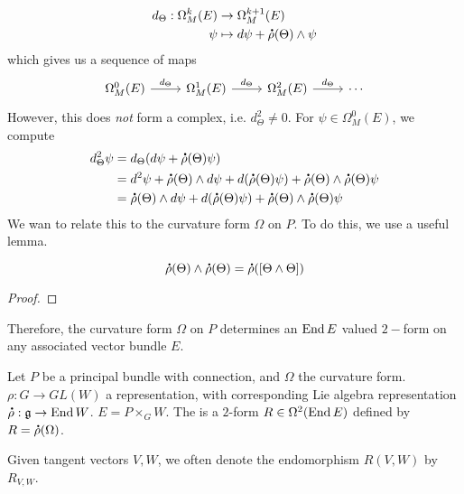 %
\begin{align*}
d_\Theta : \Omega^k_M(E) &\to \Omega^{k+1}_M(E) \\
\psi &\mapsto d\psi + \accentset{\mbox{\large\bfseries .}}{\rho}(\Theta) \wedge \psi
\end{align*}
%
which gives us a sequence of maps
\[\begin{tikzcd}
\Omega^0_M(E) \ar[r, "d_\Theta"] & \Omega^1_M(E) \ar[r, "d_\Theta"]
& \Omega^2_M(E) \ar[r, "d_\Theta"]  & \cdots
\end{tikzcd}\]
However, this does \emph{not} form a complex, i.e. $d_\Theta^2 \neq 0$. For
$\psi \in \Omega^0_M(E)$, we compute
%
\begin{align*}
d_\Theta^2\psi &= d_\Theta(d\psi + \accentset{\mbox{\large\bfseries .}}{\rho}(\Theta)\psi) \\
&= d^2\psi + \accentset{\mbox{\large\bfseries .}}{\rho}(\Theta) \wedge d\psi + d(\accentset{\mbox{\large\bfseries .}}{\rho}(\Theta)\psi)
+ \accentset{\mbox{\large\bfseries .}}{\rho}(\Theta) \wedge \accentset{\mbox{\large\bfseries .}}{\rho}(\Theta)\psi \\
&= \accentset{\mbox{\large\bfseries .}}{\rho}(\Theta) \wedge d\psi + d(\accentset{\mbox{\large\bfseries .}}{\rho}(\Theta)\psi)
+ \accentset{\mbox{\large\bfseries .}}{\rho}(\Theta) \wedge \accentset{\mbox{\large\bfseries .}}{\rho}(\Theta)\psi
\end{align*}
%
We wan to relate this to the curvature form $\Omega$ on $P$. To do this, we use a
useful lemma.
%
\begin{lem}
\[
\accentset{\mbox{\large\bfseries .}}{\rho}(\Theta) \wedge \accentset{\mbox{\large\bfseries .}}{\rho}(\Theta) = \accentset{\mbox{\large\bfseries .}}{\rho}([\Theta \wedge \Theta])
\]
\end{lem}
%
\begin{proof}

\end{proof}
%
Therefore, the curvature form $\Omega$ on $P$ determines an $\operatorname{End} E$ valued
$2-$form on any associated vector bundle $E$.
%
\begin{defn}
Let $P$ be a principal bundle with connection, and $\Omega$ the curvature form.
$\rho : G \to GL(W)$ a representation, with corresponding Lie algebra representation
$\accentset{\mbox{\large\bfseries .}}{\rho} : \mathfrak{g} \to \operatorname{End} W$. $E = P \times_G W$. The  is a
$2$-form $R \in \Omega^2(\operatorname{End} E)$ defined by $R = \accentset{\mbox{\large\bfseries .}}{\rho}(\Omega)$.
\end{defn}
%
Given tangent vectors $V,W$, we often denote the endomorphism $R(V,W)$ by $R_{V,W}$.
%